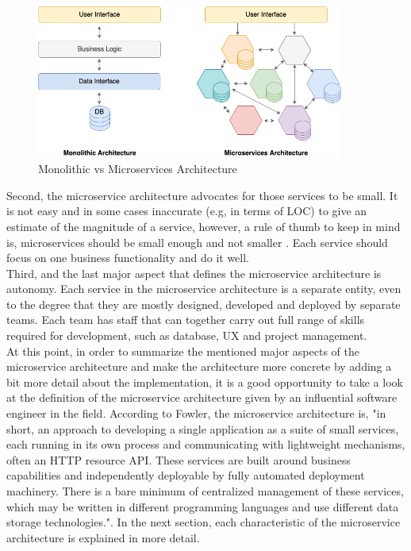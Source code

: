 \documentclass{Configuration_Files/PoliMi3i_thesis}
\begin{document}
\begin{figure}[H]
    \centering
    \includegraphics[width=0.9\textwidth]{myImages/monovsmicro.png}
    \caption{Monolithic vs Microservices Architecture}
    \label{fig:monovsmicro}
\end{figure}

Second, the microservice architecture advocates for those services to be small.
It is not easy and in some cases inaccurate (e.g, in terms of LOC) to give an estimate of the magnitude of a service, however, a rule of thumb to keep in mind is, microservices should be small enough and not smaller \cite{newman}.
Each service should focus on one business functionality and do it well.
\\
Third, and the last major aspect that defines the microservice architecture is autonomy.
Each service in the microservice architecture is a separate entity, even to the degree that they are mostly designed, developed and deployed by separate teams.
Each team has staff that can together carry out full range of skills required for development, such as database, UX and project management.
\\
At this point, in order to summarize the mentioned major aspects of the microservice architecture and make the architecture more concrete by adding a bit more detail about the implementation, it is a good opportunity to take a look at the definition of the microservice architecture given by an influential software engineer in the field.
According to Fowler, the microservice architecture is, "in short, an approach to developing a single application as a suite of small services, each running in its own process and communicating with lightweight mechanisms, often an HTTP resource API.
These services are built around business capabilities and independently deployable by fully automated deployment machinery.
There is a bare minimum of centralized management of these services, which may be written in different programming languages and use different data storage technologies."\cite{microdef}.
In the next section, each characteristic of the microservice architecture is explained in more detail.
\end{document}
